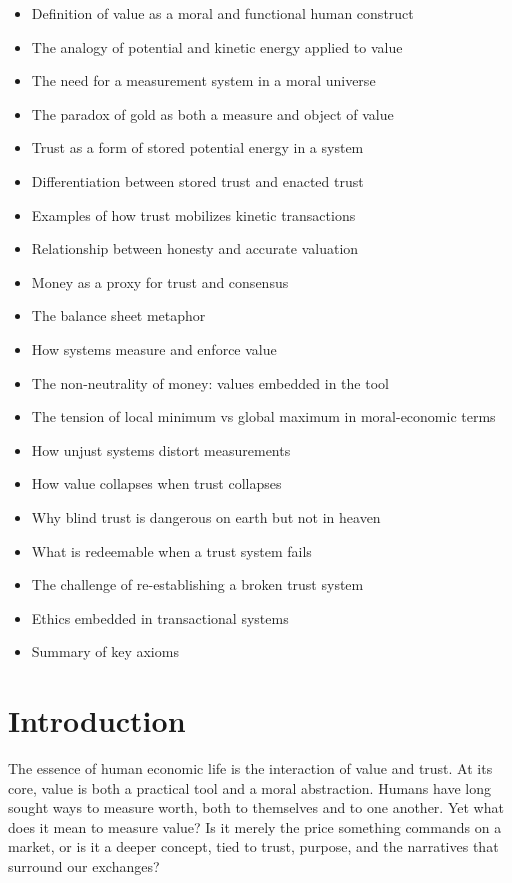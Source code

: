 \documentclass[11pt,oneside]{book}
\begin{document}
\begin{itemize}
\item Definition of value as a moral and functional human construct
\item The analogy of potential and kinetic energy applied to value
\item The need for a measurement system in a moral universe
\item The paradox of gold as both a measure and object of value
\item Trust as a form of stored potential energy in a system
\item Differentiation between stored trust and enacted trust
\item Examples of how trust mobilizes kinetic transactions
\item Relationship between honesty and accurate valuation
\item Money as a proxy for trust and consensus
\item The balance sheet metaphor
\item How systems measure and enforce value
\item The non-neutrality of money: values embedded in the tool
\item The tension of local minimum vs global maximum in moral-economic terms
\item How unjust systems distort measurements
\item How value collapses when trust collapses
\item Why blind trust is dangerous on earth but not in heaven
\item What is redeemable when a trust system fails
\item The challenge of re-establishing a broken trust system
\item Ethics embedded in transactional systems
\item Summary of key axioms
\end{itemize}

\section{Introduction}

The essence of human economic life is the interaction of value and trust. At its core, value is both a practical tool and a moral abstraction. Humans have long sought ways to measure worth, both to themselves and to one another. Yet what does it mean to measure value? Is it merely the price something commands on a market, or is it a deeper concept, tied to trust, purpose, and the narratives that surround our exchanges?
\end{document}
